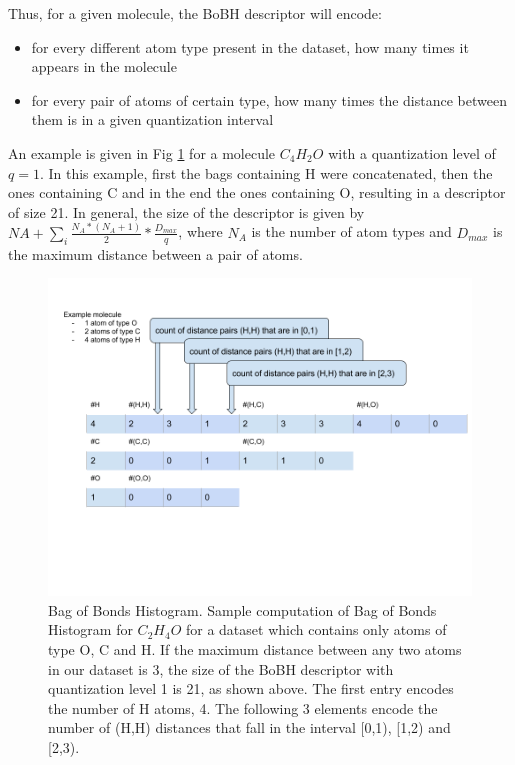 \documentclass[10pt,journal,a4paper]{IEEEtran}
\begin{document}
Thus, for a given molecule, the BoBH descriptor will encode:
\begin{itemize}
\item 
for every different atom type present in the dataset, how many times it appears in the molecule
\item  
for every pair of atoms of certain type, how many times the distance between them is in a given quantization interval 
\end{itemize}

An example is given in Fig \ref{fig:BoBH} for a molecule $C_{4}H_{2}O$ with a quantization level of $q=1$. In this example, first the bags containing H were concatenated, then the ones containing C and in the end the ones containing O, resulting in a descriptor of size 21. In general, the size of the descriptor is given by $NA + \sum_i \frac{N_A*(N_A+1)}{2} *\frac{D_{max}}{q} $, where $N_A$ is the number of atom types and $D_{max}$ is the maximum distance between a pair of atoms. 

\begin{figure}[h!]

\includegraphics[scale=0.25]{HistogramOfDistances.png}
\caption{Bag of Bonds Histogram.
Sample computation of Bag of Bonds Histogram for $C_2H_4O$ for a dataset which contains only atoms of type O, C and H. If the maximum distance between any two atoms in our dataset is 3, the size of the BoBH descriptor with quantization level  1 is 21, as shown above. The first entry encodes the number of H atoms, 4. The following 3 elements encode the number of (H,H) distances that fall in the interval [0,1), [1,2) and [2,3).
}
\label{fig:BoBH}
\end{figure}
\end{document}
